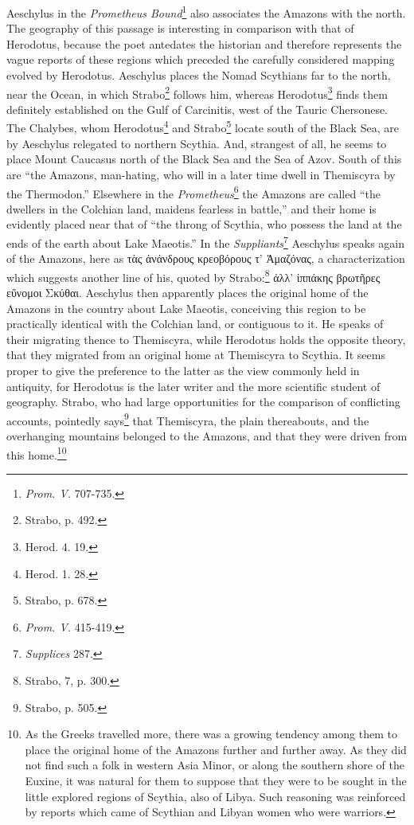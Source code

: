 \documentclass[a4paper, 12pt, oneside]{article}
\begin{document}
Aeschylus in the \emph{Prometheus Bound}\footnote{\emph{Prom. V.} 707-735.} also associates the Amazons with the north. The geography of this passage is interesting in comparison with that of Herodotus, because the poet antedates the historian and therefore represents the vague reports of these regions which preceded the carefully considered mapping evolved by Herodotus. Aeschylus places the Nomad Scythians far to the north, near the Ocean, in which Strabo\footnote{Strabo, p. 492.} follows him, whereas Herodotus\footnote{Herod. 4. 19.} finds them definitely established on the Gulf of Carcinitis, west of the Tauric Chersonese. The Chalybes, whom Herodotus\footnote{Herod. 1. 28.} and Strabo\footnote{Strabo, p. 678.} locate south of the Black Sea, are by Aeschylus relegated to northern Scythia. And, strangest of all, he seems to place Mount Caucasus north of the Black Sea and the Sea of Azov. South of this are ``the Amazons, man-hating, who will in a later time dwell in Themiscyra by the Thermodon.'' Elsewhere in the \emph{Prometheus}\footnote{\emph{Prom. V.} 415-419.} the Amazons are called ``the dwellers in the Colchian land, maidens fearless in battle,'' and their home is evidently placed near that of ``the throng of Scythia, who possess the land at the ends of the earth about Lake Maeotis.'' In the \emph{Suppliants}\footnote{\emph{Supplices} 287.} Aeschylus speaks again of the Amazons, here as τὰς ἀνάνδρους κρεοβόρους τ' Ἀμαζόνας, a characterization which suggests another line of his, quoted by Strabo:\footnote{Strabo, 7, p. 300.} ἀλλ' ἱππάκης βρωτῆρες εὔνομοι Σκύθαι. Aeschylus then apparently places the original home of the Amazons in the country about Lake Maeotis, conceiving this region to be practically identical with the Colchian land, or contiguous to it. He speaks of their migrating thence to Themiscyra, while Herodotus holds the opposite theory, that they migrated from an original home at Themiscyra to Scythia. It seems proper to give the preference to the latter as the view commonly held in antiquity, for Herodotus is the later writer and the more scientific student of geography. Strabo, who had large opportunities for the comparison of conflicting accounts, pointedly says\footnote{Strabo, p. 505.} that Themiscyra, the plain thereabouts, and the overhanging mountains belonged to the Amazons, and that they were driven from this home.\footnote{As the Greeks travelled more, there was a growing tendency among them to place the original home of the Amazons further and further away. As they did not find such a folk in western Asia Minor, or along the southern shore of the Euxine, it was natural for them to suppose that they were to be sought in the little explored regions of Scythia, also of Libya. Such reasoning was reinforced by reports which came of Scythian and Libyan women who were warriors.}
\end{document}
